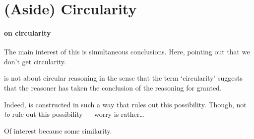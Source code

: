 \section{(Aside) Circularity}
\label{sec:aside-circularity}


\paragraph{\citeauthor{Sgaravatti:2013wu} on circularity}

{
  \color{red}
  The main interest of this is simultaneous conclusions.
  Here, pointing out that we don't get circularity.
}

\begin{note}
  \zS{} is not about circular reasoning in the sense that the term `circularity' suggests that the reasoner has taken the conclusion of the reasoning for granted.

  Indeed, \iRequ{} is constructed in such a way that rules out this possibility.
  Though, not \emph{to} rule out this possibility --- worry is rather\dots

  Of interest because some similarity.
\end{note}

